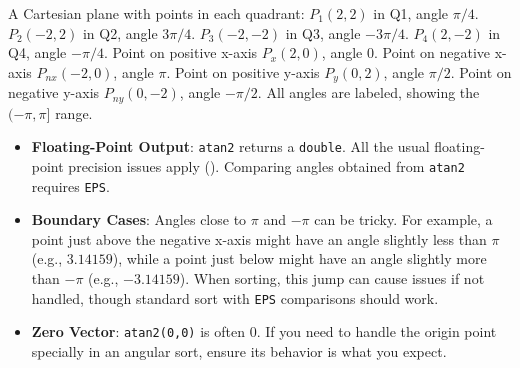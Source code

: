 \begin{visualexample}
\label{vis:A.3.3.atan2_quadrants}
A Cartesian plane with points in each quadrant:
$P_1(2,2)$ in Q1, angle $\pi/4$.
$P_2(-2,2)$ in Q2, angle $3\pi/4$.
$P_3(-2,-2)$ in Q3, angle $-3\pi/4$.
$P_4(2,-2)$ in Q4, angle $-\pi/4$.
Point on positive x-axis $P_x(2,0)$, angle $0$.
Point on negative x-axis $P_{nx}(-2,0)$, angle $\pi$.
Point on positive y-axis $P_y(0,2)$, angle $\pi/2$.
Point on negative y-axis $P_{ny}(0,-2)$, angle $-\pi/2$.
All angles are labeled, showing the $(-\pi, \pi]$ range.
\end{visualexample}

\begin{warning}
\label{warn:A.3.3.atan2_precision}
\begin{itemize}
    \item \textbf{Floating-Point Output}: \texttt{atan2} returns a \texttt{double}. All the usual floating-point precision issues apply (). Comparing angles obtained from \texttt{atan2} requires \texttt{EPS}.
    \item \textbf{Boundary Cases}: Angles close to $\pi$ and $-\pi$ can be tricky. For example, a point just above the negative x-axis might have an angle slightly less than $\pi$ (e.g., $3.14159$), while a point just below might have an angle slightly more than $-\pi$ (e.g., $-3.14159$). When sorting, this jump can cause issues if not handled, though standard sort with \texttt{EPS} comparisons should work.
    \item \textbf{Zero Vector}: \texttt{atan2(0,0)} is often 0. If you need to handle the origin point specially in an angular sort, ensure its behavior is what you expect.
\end{itemize}
\end{warning}

